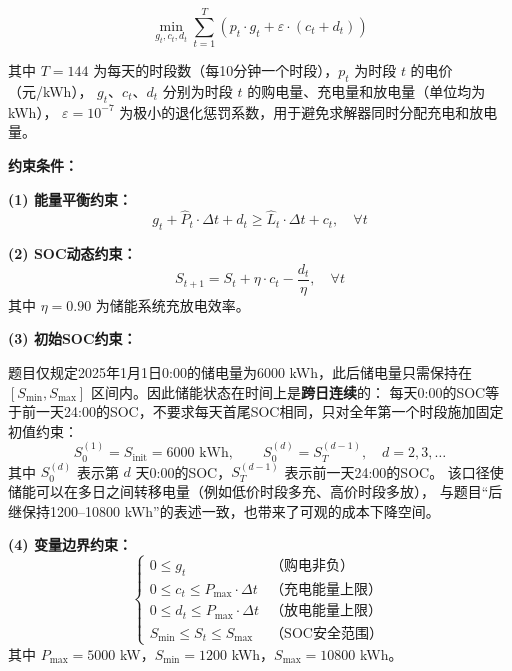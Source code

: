 \documentclass[12pt,a4paper]{article}
\begin{document}
\begin{equation}
    \min_{g_t, c_t, d_t} \sum_{t=1}^{T} \left(p_t \cdot g_t + \varepsilon \cdot (c_t + d_t)\right)
\end{equation}

其中 $T = 144$ 为每天的时段数（每10分钟一个时段），$p_t$ 为时段 $t$ 的电价（元/kWh），
$g_t$、$c_t$、$d_t$ 分别为时段 $t$ 的购电量、充电量和放电量（单位均为 kWh），
$\varepsilon = 10^{-7}$ 为极小的退化惩罚系数，用于避免求解器同时分配充电和放电量。

\textbf{约束条件：}

\textbf{(1) 能量平衡约束：}
\begin{equation}
    g_t + \hat{P}_t \cdot \Delta t + d_t \geq \hat{L}_t \cdot \Delta t + c_t, \quad \forall t
\end{equation}

\textbf{(2) SOC动态约束：}
\begin{equation}
    S_{t+1} = S_t + \eta \cdot c_t - \frac{d_t}{\eta}, \quad \forall t
\end{equation}
其中 $\eta = 0.90$ 为储能系统充放电效率。

\textbf{(3) 初始SOC约束：}

题目仅规定2025年1月1日0:00的储电量为6000 kWh，此后储电量只需保持在
$[S_{\min}, S_{\max}]$ 区间内。因此储能状态在时间上是\textbf{跨日连续}的：
每天0:00的SOC等于前一天24:00的SOC，不要求每天首尾SOC相同，只对全年第一个时段施加固定初值约束：
\begin{equation}
    S_0^{(1)} = S_{\text{init}} = 6000 \text{ kWh}, \qquad
    S_0^{(d)} = S_{T}^{(d-1)}, \quad d = 2, 3, \ldots
\end{equation}
其中 $S_0^{(d)}$ 表示第 $d$ 天0:00的SOC，$S_T^{(d-1)}$ 表示前一天24:00的SOC。
该口径使储能可以在多日之间转移电量（例如低价时段多充、高价时段多放），
与题目“后继保持1200--10800 kWh”的表述一致，也带来了可观的成本下降空间。

\textbf{(4) 变量边界约束：}
\begin{equation}
    \begin{cases}
        0 \leq g_t & \text{（购电非负）} \\
        0 \leq c_t \leq P_{\max} \cdot \Delta t & \text{（充电能量上限）} \\
        0 \leq d_t \leq P_{\max} \cdot \Delta t & \text{（放电能量上限）} \\
        S_{\min} \leq S_t \leq S_{\max} & \text{（SOC安全范围）}
    \end{cases}
\end{equation}
其中 $P_{\max} = 5000$ kW，$S_{\min} = 1200$ kWh，$S_{\max} = 10800$ kWh。
\end{document}
